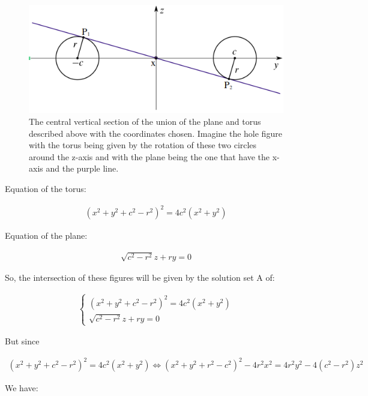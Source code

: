 \begin{figure}[H]
    \centering
    \includegraphics[scale=0.35]{villar.png}
    \caption{The central vertical section of the union of the plane and torus described above with the coordinates chosen. Imagine the hole figure with the torus being given by the rotation of these two circles around the z-axis and with the plane being the one that have the x-axis and the purple line.}
    \label{fig:villar}
\end{figure}

Equation of the torus:

\begin{gather*}
    (x^2+y^2+c^2-r^2)^2 = 4c^2(x^2+y^2)
\end{gather*}

Equation of the plane:

\begin{gather*}
    \sqrt{c^2-r^2}z+ry=0
\end{gather*}

So, the intersection of these figures will be given by the solution set A of:

\begin{gather*}
    \begin{cases}
        (x^2+y^2+c^2-r^2)^2 = 4c^2(x^2+y^2)\\
        \sqrt{c^2-r^2}z+ry=0
    \end{cases}
\end{gather*}

But since

\begin{gather*}
    (x^2+y^2+c^2-r^2)^2 = 4c^2(x^2+y^2) \Leftrightarrow (x^2+y^2+r^2-c^2)^2 - 4r^2x^2 = 4r^2y^2 - 4(c^2-r^2)z^2
\end{gather*}

We have:

